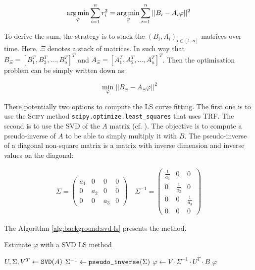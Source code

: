 \documentclass[/home/francois/latex/report/main.tex]{subfiles}
\begin{document}
\begin{equation}
  \operatorname*{arg\,min}_{\varphi} \sum_{i=1}^{n} r_i^2 = \operatorname*{arg\,min}_{\varphi} \sum_{i=1}^{n} ||B_i - A_i \varphi||^2
\end{equation}

To derive the sum, the strategy is to stack the $(B_i, A_i)_{i \in [1, n]}$ matrices over time. Here, $\Xi$ denotes a stack of matrices. In such way that $B_\Xi = [B_1^T, B_2^T, \ldots, B_n^T]^T$ and $A_\Xi = [A_1^T, A_2^T, \ldots, A_n^T]^T$. Then the optimisation problem can be simply written down as:

\begin{equation}
  \label{eq:background:stacked-ls}
  \min_{\varphi} ||B_\Xi - A_\Xi \varphi||^2
\end{equation}

  There potentially two options to compute the \ac{LS} curve fitting. The first one is to use the \textsc{Scipy} method \texttt{scipy.optimize.least\_squares} that uses \ac{TRF}. The second is to use the \ac{SVD} of the $A$ matrix (cf. \cite{Gander2008}). The objective is to compute a pseudo-inverse of $A$ to be able to simply multiply it with $B$. The pseudo-inverse of a diagonal non-square matrix is a matrix with inverse dimension and inverse values on the diagonal:

\begin{align*}
  \Sigma =
  \begin{pmatrix}
    a_1 & 0 & 0 & 0 \\
    0 & a_2 & 0 & 0 \\
    0 & 0 & a_3 & 0
  \end{pmatrix}
  &
  \ \Sigma^{-1} =
  \begin{pmatrix}
    \frac{1}{a_1} & 0 & 0 \\
    0 & \frac{1}{a_2} & 0 \\
    0 & 0 & \frac{1}{a_3} \\
    0 & 0 & 0
  \end{pmatrix}
\end{align*}


The Algorithm \ref{alg:background:svd-ls} presents the method.

\begin{algorithm}
\caption{Estimate $\varphi$ with a \ac{SVD} \ac{LS} method \label{alg:background:svd-ls}}
\begin{algorithmic}
\STATE $U, \Sigma, V^T \leftarrow \text{\texttt{SVD}}(A)$
\STATE $\Sigma^{-1} \leftarrow \text{\texttt{pseudo\_inverse}}(\Sigma)$
\STATE $\varphi \leftarrow V \cdot \Sigma^{-1} \cdot U^T \cdot B$
\RETURN $\varphi$
\end{algorithmic}
\end{algorithm}
\end{document}

